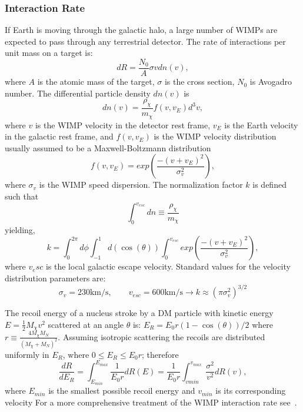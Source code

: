 \subsubsection{Interaction Rate}
If Earth is moving through the galactic halo, a large number of WIMPs are expected to pass through any terrestrial detector. The rate of interactions per unit mass on a target is:
\begin{equation}
dR = \frac{N_0}{A}\sigma v dn(v),
\end{equation} 
where $A$ is the atomic mass of the target, $\sigma$ is the cross section, $N_0$ is Avogadro number. The differential particle density $dn(v)$ is
\begin{equation}
dn(v) = \frac{\rho_{\chi}}{m_{\chi}} f(v,v_E)d^3 v,
\end{equation}
where $v$ is the WIMP velocity in the detector rest frame, $v_E$ is the Earth velocity in the galactic rest frame, and $f(v,v_E)$ is the WIMP velocity distribution usually assumed to be a Maxwell-Boltzmann distribution
\begin{equation}
f(v,v_E) = exp\left(\frac{-(v+v_E)^2}{\sigma_v ^2}\right),
\end{equation} 
where $\sigma_v$ is the WIMP speed dispersion. The normalization factor $k$ is defined such that
\begin{equation}
\int_0^{v_{esc}} dn \equiv \frac{\rho_\chi}{m_\chi} 
\end{equation}
yielding,
\begin{equation}
k = \int_0^{2\pi}d\phi \int_{-1}^1d(\cos(\theta)) \int_0^{v_{esc}} exp\left(\frac{-(v+v_E)^2}{\sigma_v ^2}\right),
\end{equation}
where $v_esc$ is the  local galactic escape velocity. Standard values for the velocity distribution parameters are:
\begin{equation}
\sigma_v = 230\mathrm{km/s}, \qquad v_{esc} = 600\mathrm{km/s} \rightarrow k \approx (\pi \sigma_v^2)^{3/2}
\end{equation} 

The recoil energy of a nucleus stroke by a DM particle with kinetic energy $E = \frac{1}{2}M_\chi v^2$ scattered at an angle $\theta$ is: $E_R = E_0r(1-\cos(\theta))/2$ where $r \equiv \frac{4M_\chi M_N}{(M_\chi + M_N)^2}$. Assuming isotropic scattering the recoils are distributed uniformly in $E_R$, where $0 \leq E_R \leq E_0 r$; therefore
\begin{equation}
\frac{dR}{dE_R} = \int_{E_{min}}^{E_{max}} \frac{1}{E_0 r}dR(E) = \frac{1}{E_0r}\int_{v{min}}^{v_{max}}\frac{\sigma^2}{v^2}dR(v),
\end{equation} 
where $E_{min}$ is the smallest possible recoil energy and $v_{min}$ is its corresponding velocity For a more comprehensive treatment of the WIMP interaction rate see~\cite{LEWIN}.


